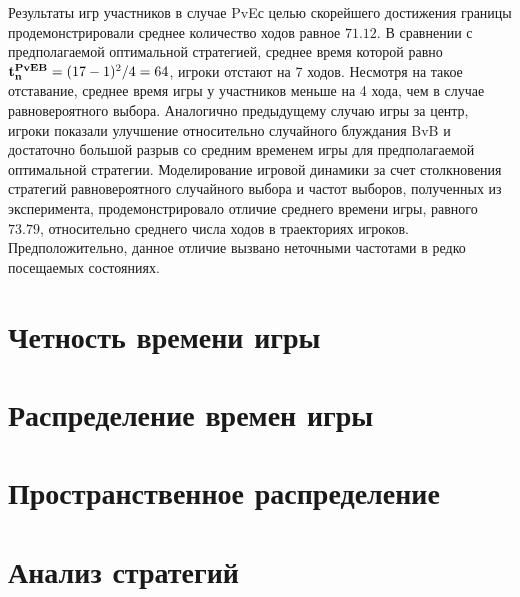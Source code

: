 Результаты игр участников в случае PvEс целью скорейшего достижения границы продемонстрировали среднее количество ходов равное $71.12$.
В сравнении с предполагаемой оптимальной стратегией, среднее время которой равно ${\bf t_n^{PvE B}} = (17-1)^2/4 = 64$, игроки 
отстают на 7 ходов. Несмотря на такое отставание, среднее время игры у участников меньше на 4 хода, чем в случае равновероятного выбора. 
Аналогично предыдущему случаю игры за центр, игроки показали улучшение относительно случайного блуждания BvB и достаточно большой разрыв со средним временем игры
для предполагаемой оптимальной стратегии. Моделирование игровой динамики за счет столкновения стратегий равновероятного случайного выбора и 
частот выборов, полученных из эксперимента, продемонстрировало отличие среднего времени игры, равного $73.79$, относительно среднего числа ходов в траекториях игроков.
Предположительно, данное отличие вызвано неточными частотами в редко посещаемых состояниях. 



\section{Четность времени игры}\label{sec:ch3/sec2}

\section{Распределение времен игры}\label{sec:ch3/sec3}

\section{Пространственное распределение}\label{sec:ch3/sec4}

\section{Анализ стратегий}\label{sec:ch3/sec5}


